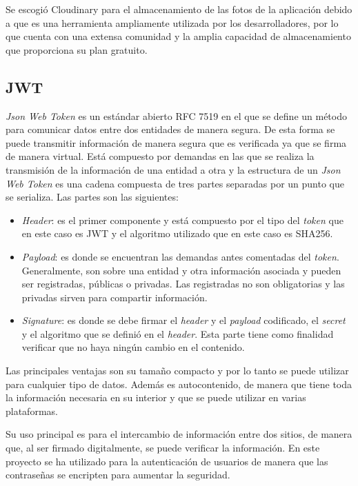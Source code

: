 Se escogió Cloudinary para el almacenamiento de las fotos de la aplicación debido a que es una herramienta ampliamente utilizada por los desarrolladores, por lo que cuenta con una extensa comunidad y la amplia capacidad de almacenamiento que proporciona su plan gratuito.


\subsection{JWT}
\textit{Json Web Token} \cite{jwt} es un estándar abierto RFC 7519 en el que se define un método para comunicar datos entre dos entidades de manera segura. De esta forma se puede transmitir información de manera segura que es verificada ya que se firma de manera virtual. Está compuesto por demandas en las que se realiza la transmisión de la información de una entidad a otra y la estructura de un \textit{Json Web Token} es una cadena compuesta de tres partes separadas por un punto que se serializa. Las partes son las siguientes:

\begin{itemize}
    \item \textit{Header}: es el primer componente y está compuesto por el tipo del \textit{token} que en este caso es JWT y el algoritmo utilizado que en este caso es SHA256.
    \item \textit{Payload}: es donde se encuentran las demandas antes comentadas del \textit{token}. Generalmente, son sobre una entidad y otra información asociada y pueden ser registradas, públicas o privadas. Las registradas no son obligatorias y las privadas sirven para compartir información. 
    \item \textit{Signature}: es donde se debe firmar el \textit{header} y el \textit{payload} codificado, el \textit{secret} y el algoritmo que se definió en el \textit{header}. Esta parte tiene como finalidad verificar que no haya ningún cambio en el contenido.
\end{itemize}

Las principales ventajas son su tamaño compacto y por lo tanto se puede utilizar para cualquier tipo de datos. Además es autocontenido, de manera que tiene toda la información necesaria en su interior y que se puede utilizar en varias plataformas. 

Su uso principal es para el intercambio de información entre dos sitios, de manera que, al ser firmado digitalmente, se puede verificar la información. En este proyecto se ha utilizado para la autenticación de usuarios de manera que las contraseñas se encripten para aumentar la seguridad.

